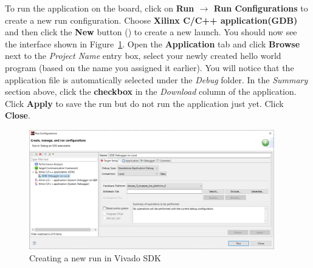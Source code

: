 \documentclass[11pt]{article}
\begin{document}
To run the application on the board, click on \textbf{Run $\rightarrow$ Run Configurations} to create a new run configuration. Choose \textbf{Xilinx C/C++ application(GDB)} and then click the \textbf{New} button
()
to create a new launch. You should now see the interface shown in Figure~\ref{fig:new_run_config}. Open the \textbf{Application} tab and click \textbf{Browse} next to the \textit{Project Name} entry box, select your newly created hello world program (based on the name you assigned it earlier). You will notice that the application file is automatically selected under the \textit{Debug} folder. In the \textit{Summary} section above, click the \textbf{checkbox} in the \textit{Download} column of the application. Click \textbf{Apply} to save the run but do not run the application just yet. Click \textbf{Close}.

\begin{figure}[!h]
    \centering
    \includegraphics[width=0.95\textwidth]{images/new_run_config.png}
    \caption{Creating a new run in Vivado SDK}
    \label{fig:new_run_config}
\end{figure}
\end{document}
